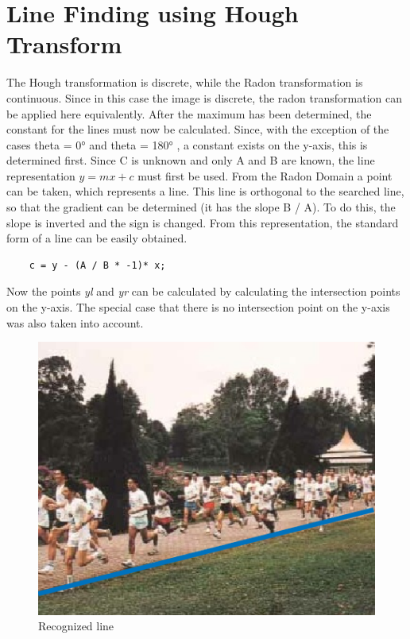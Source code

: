 \documentclass{article}
\begin{document}
	\section{Line Finding using Hough Transform}

	The Hough transformation is discrete, while the Radon transformation is continuous. 
	Since in this case the image is discrete, the radon transformation can be applied here equivalently. After the maximum has been determined, the constant for the lines must now be calculated.
	Since, with the exception of the cases theta = 0° and theta = 180° , a constant exists on the y-axis, this is determined first.
	Since C is unknown and only A and B are known, the line representation $  y = mx +c $ must first be used. 
	From the Radon Domain a point can be taken, which represents a line. 
	This line is orthogonal to the searched line, so that the gradient can be determined (it has the slope B / A). 
	To do this, the slope is inverted and the sign is changed. From this representation, the standard form of a line can be easily obtained.
	
	\begin{verbatim}
	c = y - (A / B * -1)* x;
	\end{verbatim}
	Now the points \textit{yl} and \textit{yr} can be calculated by calculating the intersection points on the y-axis.
	The special case that there is no intersection point on the y-axis was also taken into account.
	\begin{figure}[!h]
		\center
		\caption{Recognized line}
		\includegraphics[scale=0.75]{macritchie_line_disp.png}
		
	\end{figure}
\end{document}
